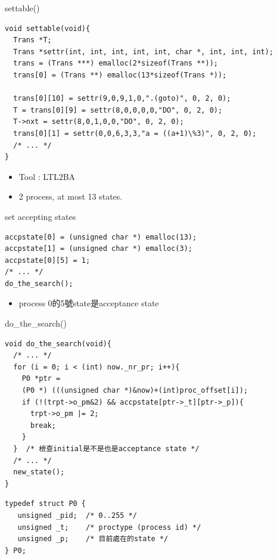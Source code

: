 \documentclass[12pt]{beamer}
\begin{document}
\begin{frame}[fragile]{settable()}
\begin{lstlisting}[basicstyle=\footnotesize\ttfamily]
void settable(void){ 
  Trans *T;
  Trans *settr(int, int, int, int, int, char *, int, int, int);
  trans = (Trans ***) emalloc(2*sizeof(Trans **));
  trans[0] = (Trans **) emalloc(13*sizeof(Trans *));

  trans[0][10] = settr(9,0,9,1,0,".(goto)", 0, 2, 0);
  T = trans[0][9] = settr(8,0,0,0,0,"DO", 0, 2, 0);
  T->nxt = settr(8,0,1,0,0,"DO", 0, 2, 0);
  trans[0][1] = settr(0,0,6,3,3,"a = ((a+1)\%3)", 0, 2, 0);
  /* ... */
}
\end{lstlisting}
\begin{itemize}
	\item Tool : LTL2BA
	\item 2 process, at most 13 states.
\end{itemize}
\end{frame}

\begin{frame}[fragile]{set accepting states}
\begin{lstlisting}[basicstyle=\normalsize\ttfamily]
accpstate[0] = (unsigned char *) emalloc(13);
accpstate[1] = (unsigned char *) emalloc(3);
accpstate[0][5] = 1;
/* ... */
do_the_search();
\end{lstlisting}
\begin{itemize}
	\item process 0的5號state是acceptance state
\end{itemize}
\end{frame}

\begin{frame}[fragile]{do\_the\_search()}
\begin{lstlisting}[basicstyle=\footnotesize\ttfamily]
void do_the_search(void){
  /* ... */
  for (i = 0; i < (int) now._nr_pr; i++){
    P0 *ptr = 
    (P0 *) (((unsigned char *)&now)+(int)proc_offset[i]);
    if (!(trpt->o_pm&2) && accpstate[ptr->_t][ptr->_p]){
      trpt->o_pm |= 2;
      break;
    }
  }  /* 檢查initial是不是也是acceptance state */
  /* ... */
  new_state();
}
\end{lstlisting}
\begin{lstlisting}[basicstyle=\footnotesize\ttfamily]
typedef struct P0 {
   unsigned _pid;  /* 0..255 */
   unsigned _t;    /* proctype (process id) */
   unsigned _p;    /* 目前處在的state */
} P0;
\end{lstlisting}
\end{frame}
\end{document}
